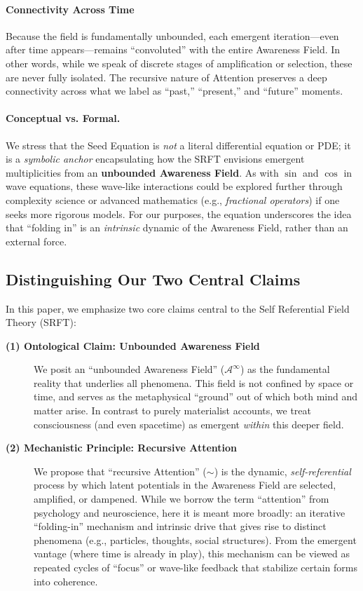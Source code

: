 \documentclass[12pt,a4paper]{article}
\begin{document}
\paragraph{Connectivity Across Time}
Because the field is fundamentally unbounded, each emergent iteration---even after time appears---remains ``convoluted'' with the entire Awareness Field. In other words, while we speak of discrete stages of amplification or selection, these are never fully isolated. The recursive nature of Attention preserves a deep connectivity across what we label as ``past,'' ``present,'' and ``future'' moments.

\paragraph{Conceptual vs. Formal.}
We stress that the Seed Equation is \emph{not} a literal differential equation or PDE; it is a \emph{symbolic anchor} encapsulating how the SRFT envisions emergent multiplicities from an \textbf{unbounded Awareness Field}. As with \(\sin\) and \(\cos\) in wave equations, these wave-like interactions could be explored further through complexity science or advanced mathematics (e.g., \emph{fractional operators}) if one seeks more rigorous models. For our purposes, the equation underscores the idea that “folding in” is an \emph{intrinsic} dynamic of the Awareness Field, rather than an external force.

\subsection{Distinguishing Our Two Central Claims}

\noindent
In this paper, we emphasize two core claims central to the Self Referential Field Theory (SRFT):

\begin{description}
  \item[\textbf{(1) Ontological Claim: Unbounded Awareness Field}] 
  We posit an ``unbounded Awareness Field'' (\(\mathscr{A}^\infty\)) as the fundamental reality that underlies all phenomena. 
  This field is not confined by space or time, and serves as the metaphysical ``ground'' out of which both mind and matter arise.
  In contrast to purely materialist accounts, we treat consciousness (and even spacetime) as emergent \emph{within} this deeper field.

  \item[\textbf{(2) Mechanistic Principle: Recursive Attention}]
  We propose that ``recursive Attention'' (\(\sim\)) is the dynamic, \emph{self-referential} process by which latent potentials in the Awareness Field are selected, amplified, or dampened. 
  While we borrow the term ``attention'' from psychology and neuroscience, here it is meant more broadly: an iterative ``folding-in'' mechanism and intrinsic drive that gives rise to distinct phenomena (e.g., particles, thoughts, social structures). 
  From the emergent vantage (where time is already in play), this mechanism can be viewed as repeated cycles of ``focus'' or wave-like feedback that stabilize certain forms into coherence.
\end{description}
\end{document}
